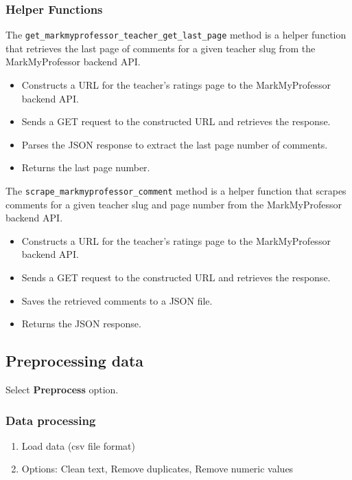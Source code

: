\subsubsection*{Helper Functions}
The \texttt{get\_markmyprofessor\_teacher\_get\_last\_page} method is a helper function that retrieves the last page of comments for a given teacher slug from the MarkMyProfessor backend API.

\begin{itemize}
    \item Constructs a URL for the teacher's ratings page to the MarkMyProfessor backend API.
    \item Sends a GET request to the constructed URL and retrieves the response.
    \item Parses the JSON response to extract the last page number of comments.
    \item Returns the last page number.
\end{itemize}

The \texttt{scrape\_markmyprofessor\_comment} method is a helper function that scrapes comments for a given teacher slug and page number from the MarkMyProfessor backend API.

\begin{itemize}
    \item Constructs a URL for the teacher's ratings page to the MarkMyProfessor backend API.
    \item Sends a GET request to the constructed URL and retrieves the response.
    \item Saves the retrieved comments to a JSON file.
    \item Returns the JSON response.
\end{itemize}

\subsection{Preprocessing data}
Select \textbf{Preprocess} option.

\subsubsection*{Data processing}
\begin{enumerate}
    \item Load data (csv file format)
    \item Options: Clean text, Remove duplicates, Remove numeric values
\end{enumerate}

